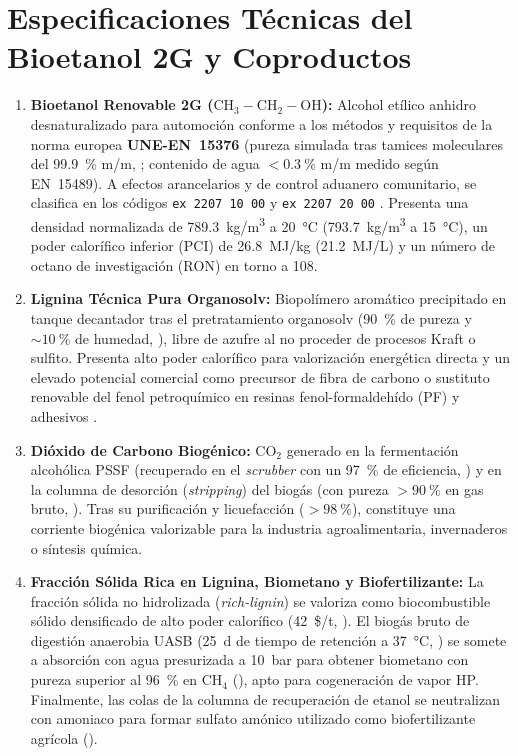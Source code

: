 \documentclass{report}
\begin{document}
\section{Especificaciones Técnicas del Bioetanol 2G y Coproductos}
\begin{enumerate}
    \item \textbf{Bioetanol Renovable 2G ($\mathrm{CH_3-CH_2-OH}$):} Alcohol etílico anhidro desnaturalizado para automoción conforme a los métodos y requisitos de la norma europea \textbf{UNE-EN~15376} (pureza simulada tras tamices moleculares del \SI{99.9}{\percent} m/m, \textcite[Sección~2.1.4]{Jafari-Gohargan2026}; contenido de agua $< \SI{0.3}{\percent}$ m/m medido según EN~15489). A efectos arancelarios y de control aduanero comunitario, se clasifica en los códigos \texttt{ex~2207~10~00} y \texttt{ex~2207~20~00} \autocite[Considerando~2 y Anexo]{DOUE2026}. Presenta una densidad normalizada de \SI{789.3}{\kilo\gram/\cubic\meter} a \SI{20}{\celsius} (\SI{793.7}{\kilo\gram/\cubic\meter} a \SI{15}{\celsius}), un poder calorífico inferior (PCI) de \SI{26.8}{\mega\joule/\kilo\gram} (\SI{21.2}{\mega\joule/\liter}) y un número de octano de investigación ($\text{RON}$) en torno a 108.
    \item \textbf{Lignina Técnica Pura Organosolv:} Biopolímero aromático precipitado en tanque decantador tras el pretratamiento organosolv (\SI{90}{\percent} de pureza y $\sim \SI{10}{\percent}$ de humedad, \textcite[Sección~2.1.5]{Jafari-Gohargan2026}), libre de azufre al no proceder de procesos Kraft o sulfito. Presenta alto poder calorífico para valorización energética directa y un elevado potencial comercial como precursor de fibra de carbono o sustituto renovable del fenol petroquímico en resinas fenol-formaldehído (PF) y adhesivos \autocite[Sección~2.1.5 y Tabla~5]{Jafari-Gohargan2026}.
    \item \textbf{Dióxido de Carbono Biogénico:} $\text{CO}_2$ generado en la fermentación alcohólica PSSF (recuperado en el \textit{scrubber} con un \SI{97}{\percent} de eficiencia, \textcite[Sección~2.1.4]{Jafari-Gohargan2026}) y en la columna de desorción (\textit{stripping}) del biogás (con pureza $> \SI{90}{\percent}$ en gas bruto, \textcite[Sección~2.1.8]{Jafari-Gohargan2026}). Tras su purificación y licuefacción ($> \SI{98}{\percent}$), constituye una corriente biogénica valorizable para la industria agroalimentaria, invernaderos o síntesis química.
    \item \textbf{Fracción Sólida Rica en Lignina, Biometano y Biofertilizante:} La fracción sólida no hidrolizada (\textit{rich-lignin}) se valoriza como biocombustible sólido densificado de alto poder calorífico (\SI{42}{\$/\tonne}, \textcite[Tabla~5]{Jafari-Gohargan2026}). El biogás bruto de digestión anaerobia UASB (\SI{25}{d} de tiempo de retención a \SI{37}{\celsius}, \textcite[Sección~2.1.7]{Jafari-Gohargan2026}) se somete a absorción con agua presurizada a \SI{10}{\bar} para obtener biometano con pureza superior al \SI{96}{\percent} en $\text{CH}_4$ (\textcite[Sección~2.1.8]{Jafari-Gohargan2026}), apto para cogeneración de vapor HP. Finalmente, las colas de la columna de recuperación de etanol se neutralizan con amoniaco para formar sulfato amónico utilizado como biofertilizante agrícola (\textcite[Sección~2.2.1]{Jafari-Gohargan2026}).

\end{enumerate}
\end{document}
